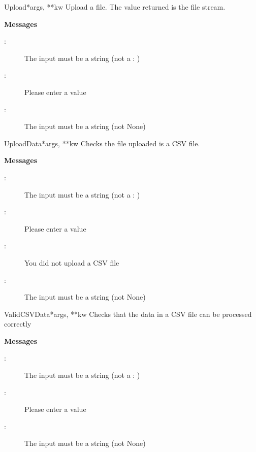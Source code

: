 \documentclass[letterpaper,10pt,english]{manual}
\begin{document}
\hypertarget{webscavator.forms.validators.Upload}{}\begin{classdesc}{Upload}{*args, **kw}
Upload a file. The value returned is the file stream.

\textbf{Messages}
\begin{description}
\item[:]
The input must be a string (not a : )

\item[:]
Please enter a value

\item[:]
The input must be a string (not None)

\end{description}
\end{classdesc}

\hypertarget{webscavator.forms.validators.UploadData}{}\begin{classdesc}{UploadData}{*args, **kw}
Checks the file uploaded is a CSV file.

\textbf{Messages}
\begin{description}
\item[:]
The input must be a string (not a : )

\item[:]
Please enter a value

\item[:]
You did not upload a CSV file

\item[:]
The input must be a string (not None)

\end{description}
\end{classdesc}

\hypertarget{webscavator.forms.validators.ValidCSVData}{}\begin{classdesc}{ValidCSVData}{*args, **kw}
Checks that the data in a CSV file can be processed correctly

\textbf{Messages}
\begin{description}
\item[:]
The input must be a string (not a : )

\item[:]
Please enter a value

\item[:]
The input must be a string (not None)

\end{description}
\end{classdesc}
\hypertarget{module-webscavator.forms}{}
\modulesynopsis{}
\end{document}
